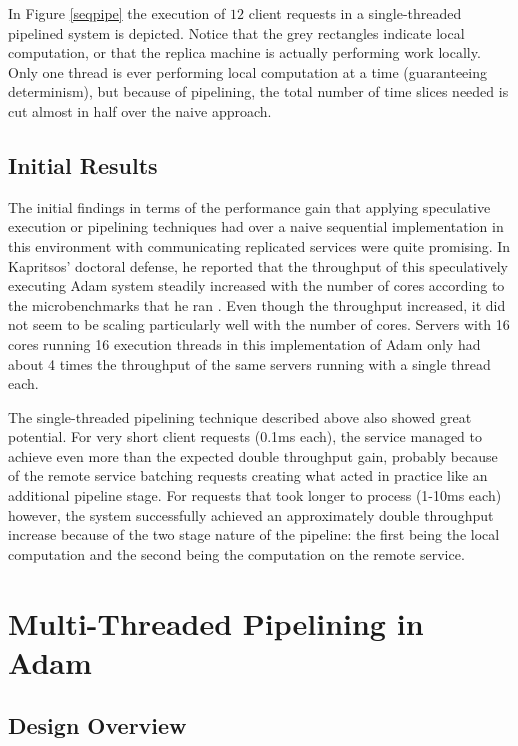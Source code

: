 \documentclass[11pt, oneside]{report}
\begin{document}
In Figure \ref{seqpipe} the execution of $12$ client requests in a single-threaded pipelined system is depicted. Notice that the grey rectangles indicate local computation, or that the replica machine is actually performing work locally. Only one thread is ever performing local computation at a time (guaranteeing determinism), but because of pipelining, the total number of time slices needed is cut almost in half over the naive approach.

\section{Initial Results}

The initial findings in terms of the performance gain that applying speculative execution or pipelining techniques had over a naive sequential implementation in this environment with communicating replicated services were quite promising. 
In Kapritsos' doctoral defense, he reported that the throughput of this speculatively executing Adam system steadily increased with the number of cores according to the microbenchmarks that he ran \cite{manosThesis}. 
Even though the throughput increased, it did not seem to be scaling particularly well with the number of cores. 
Servers with 16 cores running 16 execution threads in this implementation of Adam only had about 4 times the throughput of the same servers running with a single thread each.

The single-threaded pipelining technique described above also showed great potential. 
For very short client requests (0.1ms each), the service managed to achieve even more than the expected double throughput gain, probably because of the remote service batching requests creating what acted in practice like an additional pipeline stage. 
For requests that took longer to process (1-10ms each) however, the system successfully achieved an approximately double throughput increase because of the two stage nature of the pipeline: the first being the local computation and the second being the computation on the remote service.

\chapter{Multi-Threaded Pipelining in Adam}\label{AdamDesign}

\section{Design Overview}
\end{document}
